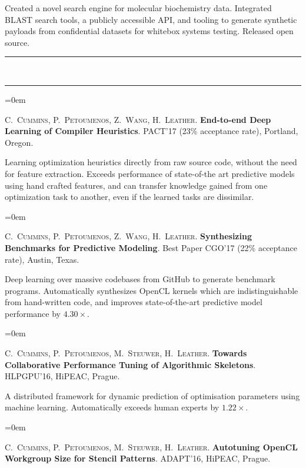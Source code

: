 \documentclass[a4paper,11pt,hidelinks]{scrartcl}
\newcommand{\MarginText}[1]{\marginpar{\raggedleft\itshape\normalsize#1}}
\newcommand{\Title}[1]{\noindent\rule{15cm}{0.4pt}\vspace{-.45em}\\
\noindent\spacedlowsmallcaps{\color{titlecolour}{#1}}

\vspace{-.85em}\noindent\rule{15cm}{0.4pt}\vspace{.2em}}
\newcommand{\Description}[1]{\hangindent=0em\hangafter=0%
\noindent\normalsize{#1}\vspace{1em}}
\newcommand{\Publication}[5]{\Description{\MarginText{#1}#2. \textbf{\href{#5}{#3}}. #4.}}
\begin{document}
\begin{cv}
{  \noindent %
  Created a novel search engine for molecular biochemistry data. Integrated BLAST search tools, a publicly accessible API, and tooling to generate synthetic payloads from confidential datasets for whitebox systems testing. Released open source.%
}

\Title{Publications}

\Description{\MarginText{\textit{2017}}C.\ \textsc{Cummins}, P.\
  \textsc{Petoumenos}, Z.\ \textsc{Wang}, H.\
  \textsc{Leather}. \textbf{End-to-end Deep Learning of Compiler Heuristics}. PACT'17 (23\% acceptance rate), Portland, Oregon.\@
  \newline\vspace{-.8em}

  \noindent %
  Learning optimization heuristics directly from raw source code, without the need for feature extraction. Exceeds performance of state-of-the art predictive models using hand crafted features, and can transfer knowledge gained from one optimization task to another, even if the learned tasks are dissimilar.%
}

\Description{\MarginText{2017}C.\ \textsc{Cummins}, P.\
  \textsc{Petoumenos}, Z.\ \textsc{Wang}, H.\
  \textsc{Leather}. \textbf{Synthesizing Benchmarks for Predictive Modeling}. Best Paper CGO'17 (22\% acceptance rate), Austin, Texas.\@
  \newline\vspace{-.8em}

  \noindent %
  Deep learning over massive codebases from GitHub to generate benchmark programs. Automatically synthesizes OpenCL kernels which are indistinguishable from hand-written code, and improves state-of-the-art predictive model performance by $4.30\times$.%
}

\Description{\MarginText{2016}C.\ \textsc{Cummins}, P.\
  \textsc{Petoumenos}, M.\ \textsc{Steuwer}, H.\
  \textsc{Leather}. \textbf{Towards Collaborative Performance Tuning
    of Algorithmic Skeletons}. HLPGPU'16, HiPEAC, Prague.\@
  \newline\vspace{-.8em}

  \noindent %
  A distributed framework for dynamic prediction of optimisation parameters using machine learning. Automatically exceeds human experts by $1.22\times$.%
}

\Description{\MarginText{2016}C.\ \textsc{Cummins}, P.\
  \textsc{Petoumenos}, M.\ \textsc{Steuwer}, H.\
  \textsc{Leather}. \textbf{Autotuning OpenCL Workgroup Size for
    Stencil Patterns}. ADAPT'16, HiPEAC, Prague.\@ \newline\vspace{-.8em}

}
\end{cv}
\end{document}
